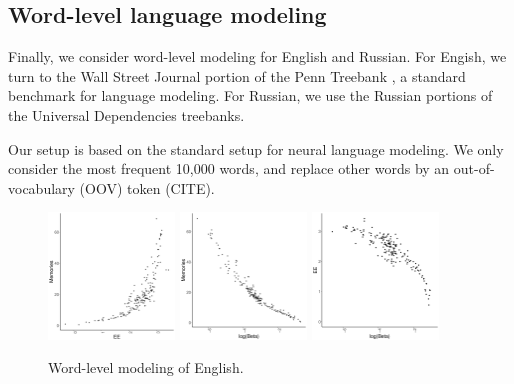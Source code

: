 \documentclass[11pt,letterpaper]{article}
\begin{document}
\subsection{Word-level language modeling}

Finally, we consider word-level modeling for English and Russian.
For Engish, we turn to the Wall Street Journal portion of the Penn Treebank \citep{marcus-building-1993}, a standard benchmark for language modeling.
For Russian, we use the Russian portions of the Universal Dependencies treebanks.

Our setup is based on the standard setup for neural language modeling.
We only consider the most frequent 10,000 words, and replace other words by an out-of-vocabulary (OOV) token (CITE).





\begin{figure}
\includegraphics[width=0.3\textwidth]{cryptfig/en-words-ee-mem.pdf}
\includegraphics[width=0.3\textwidth]{cryptfig/en-words-logbeta-mem.pdf}
\includegraphics[width=0.3\textwidth]{cryptfig/en-words-logbeta-ee.pdf}
	\caption{Word-level modeling of English.}\label{fig:eng-logbeta}
\end{figure}
\end{document}
